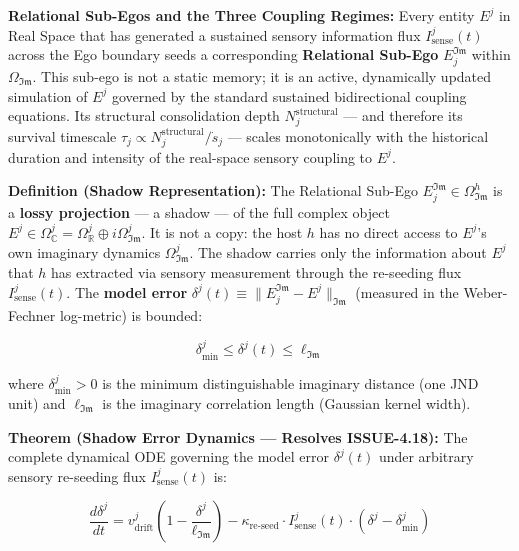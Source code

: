 \documentclass[11pt,a4paper]{article}
\theoremstyle{definition}
\theoremstyle{remark}
\begin{document}
\textbf{Relational Sub-Egos and the Three Coupling Regimes:} Every entity $E^j$ in Real Space that has generated a sustained sensory information flux $I_{\text{sense}}^j(t)$ across the Ego boundary seeds a corresponding \textbf{Relational Sub-Ego} $E_j^{\mathfrak{Im}}$ within $\Omega_{\mathfrak{Im}}$. This sub-ego is not a static memory; it is an active, dynamically updated simulation of $E^j$ governed by the standard sustained bidirectional coupling equations. Its structural consolidation depth $N_j^{\text{structural}}$ — and therefore its survival timescale $\tau_j \propto N_j^{\text{structural}} / \dot{s}_j$ — scales monotonically with the historical duration and intensity of the real-space sensory coupling to $E^j$.

\textbf{Definition (Shadow Representation):} The Relational Sub-Ego $E_j^{\mathfrak{Im}} \in \Omega_{\mathfrak{Im}}^h$ is a \textbf{lossy projection} — a shadow — of the full complex object $E^j \in \Omega_\mathbb{C}^j = \Omega_\mathbb{R}^j \oplus i\Omega_{\mathfrak{Im}}^j$. It is not a copy: the host $h$ has no direct access to $E^j$'s own imaginary dynamics $\Omega_{\mathfrak{Im}}^j$. The shadow carries only the information about $E^j$ that $h$ has extracted via sensory measurement through the re-seeding flux $I_{\text{sense}}^j(t)$. The \textbf{model error} $\delta^j(t) \equiv \|E_j^{\mathfrak{Im}} - E^j\|_{\mathfrak{Im}}$ (measured in the Weber-Fechner log-metric) is bounded:


\begin{equation}
\delta_{\min}^j \leq \delta^j(t) \leq \ell_{\mathfrak{Im}}
\end{equation}


where $\delta_{\min}^j > 0$ is the minimum distinguishable imaginary distance (one JND unit) and $\ell_{\mathfrak{Im}}$ is the imaginary correlation length (Gaussian kernel width).

\textbf{Theorem (Shadow Error Dynamics — Resolves ISSUE-4.18):} The complete dynamical ODE governing the model error $\delta^j(t)$ under arbitrary sensory re-seeding flux $I_{\text{sense}}^j(t)$ is:


\begin{equation}
\boxed{\frac{d\delta^j}{dt} = v_{\text{drift}}^j \left(1 - \frac{\delta^j}{\ell_{\mathfrak{Im}}}\right) - \kappa_{\text{re-seed}} \cdot I_{\text{sense}}^j(t) \cdot \left(\delta^j - \delta_{\min}^j\right)}
\end{equation}
\end{document}
